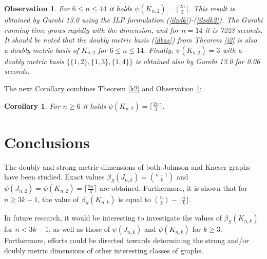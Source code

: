 \documentclass[preprint,12pt]{elsarticle}
\newtheorem{obs}{Observation}
\newtheorem{cor}{Corollary}
\begin{document}
\begin{obs} \label{k2a} For $6 \le n \le 14$ it holds  $\psi(K_{n,2}) = \lceil \frac{2n}{3} \rceil$.
This result is obtained by Gurobi 13.0 using the ILP formulation (\ref{ilpdk})-(\ref{ilpdk2}).
The Gurobi running time grows rapidly with the dimension,
and for $n=14$ it is 7223 seconds. It should be noted that the doubly metric basis (\ref{dbas})
from Theorem \ref{j2} is also a doubly metric basis of $K_{n,2}$ for $6 \le n \le 14$.
Finally, $\psi(K_{5,2}) = 3$ with a doubly metric basis $\{ \{1,2\}, \{1,3\}, \{1,4\} \}$
is obtained also by Gurobi 13.0 for 0.06 seconds.
\end{obs}
 

The next Corollary combines Theorem \ref{k2} and Observation \ref{k2a}:  

\begin{cor} \label{k2b} For $n \ge 6$ it holds  $\psi(K_{n,2}) = \lceil \frac{2n}{3} \rceil$.
\end{cor}

\section{Conclusions}

The doubly and strong metric dimensions of both Johnson and Kneser graphs have been studied. 
Exact values $\beta_S(J_{n,k}) = \binom{n-1}{k}$ and $\psi(J_{n,2}) = \psi(K_{n,2}) = \lceil \frac{2n}{3} \rceil$
are obtained. Furthermore, it is shown that for $n \ge 3k-1$, the value of $\beta_S(K_{n,k})$ is equal to $\binom{n}{k} - \lfloor \frac{n}{k} \rfloor$.

In future research, it would be interesting to investigate the values of $\beta_S(K_{n,k})$ for $n < 3k-1$,
as well as those of $\psi(J_{n,k})$ and $\psi(K_{n,k})$ for $k \ge 3$.
Furthermore, efforts could be directed towards determining the strong and/or doubly metric dimensions of other interesting classes of graphs. 
 

 
\end{document}
